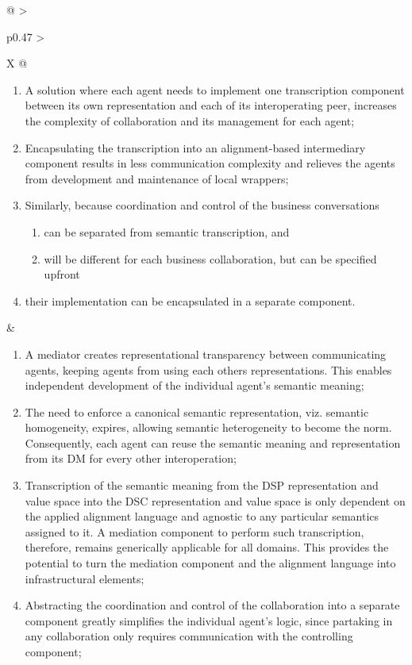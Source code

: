 \begin{xltabular}[l]{\linewidth}{@{} >{\small\raggedright\arraybackslash}p{0.47\linewidth} >{\small\raggedright\arraybackslash}X @{}}
\begin{enumerate}[left=6pt, nosep]
  \item A solution where each agent needs to implement one transcription component between its own representation and each of its interoperating peer, increases the complexity of collaboration and its management for each agent;
  \item Encapsulating the transcription into an alignment-based intermediary component results in less communication complexity and relieves the agents from development and maintenance of local wrappers;
  \item Similarly, because coordination and control of the business conversations
  \begin{enumerate}
    \item can be separated from semantic transcription, and
    \item will be different for each business collaboration, but can be specified upfront 
  \end{enumerate}
  \item their implementation can be encapsulated in a separate component.
\end{enumerate}
&
\begin{enumerate}[left=10pt, nosep]
  \item A mediator creates representational transparency between communicating agents, keeping agents from using each others representations. This enables independent development of the individual agent’s semantic meaning;
  \item The need to enforce a canonical semantic representation, viz. semantic homogeneity, expires, allowing semantic heterogeneity to become the norm. Consequently, each agent can reuse the semantic meaning and representation from its DM for every other interoperation;
  \item Transcription of the semantic meaning from the DSP representation and value space into the DSC representation and value space is only dependent on the applied alignment language and agnostic to any particular semantics assigned to it. A mediation component to perform such transcription, therefore, remains generically applicable for all domains. This provides the potential to turn the mediation component and the alignment language into infrastructural elements;
  \item Abstracting the coordination and control of the collaboration into a separate component greatly simplifies the individual agent's logic, since partaking in any collaboration only requires communication with the controlling component;

\end{enumerate}
\end{xltabular}
